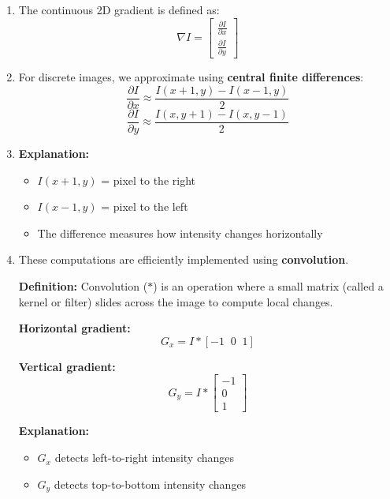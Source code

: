 \documentclass[12pt]{article}
\begin{document}
\begin{enumerate}
    \item The continuous 2D gradient is defined as:
          \[
              \nabla I =
              \begin{bmatrix}
                  \frac{\partial I}{\partial x} \\
                  \frac{\partial I}{\partial y}
              \end{bmatrix}
          \]
    \item For discrete images, we approximate using \textbf{central finite differences}:
          \[
              \frac{\partial I}{\partial x} \approx \frac{I(x+1,y) - I(x-1,y)}{2}
          \]
          \[
              \frac{\partial I}{\partial y} \approx \frac{I(x,y+1) - I(x,y-1)}{2}
          \]
    \item \textbf{Explanation:}
          \begin{itemize}
              \item $I(x+1,y)$ = pixel to the right
              \item $I(x-1,y)$ = pixel to the left
              \item The difference measures how intensity changes horizontally
          \end{itemize}
    \item These computations are efficiently implemented using \textbf{convolution}.

          \textbf{Definition:} Convolution ($\ast$) is an operation where a small matrix (called a kernel or filter) slides across the image to compute local changes.

          \textbf{Horizontal gradient:}
          \[
              G_x = I \ast [-1 \;\; 0 \;\; 1]
          \]

          \textbf{Vertical gradient:}
          \[
              G_y = I \ast
              \begin{bmatrix}
                  -1 \\
                  0  \\
                  1
              \end{bmatrix}
          \]

          \textbf{Explanation:}
          \begin{itemize}
              \item $G_x$ detects left-to-right intensity changes
              \item $G_y$ detects top-to-bottom intensity changes
          \end{itemize}


\end{enumerate}
\end{document}

